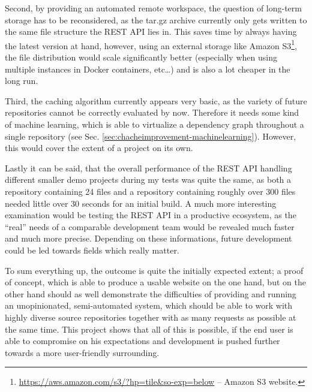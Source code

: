 Second, by providing an automated remote workspace, the question of long-term storage has to be reconsidered, as the tar.gz archive currently only gets written to the same file structure the REST API lies in. This saves time by always having the latest version at hand, however, using an external storage like Amazon S3\footnote{\url{https://aws.amazon.com/s3/?hp=tile&so-exp=below} -- Amazon S3 website.}, the file distribution would scale significantly better (especially when using multiple instances in Docker containers, etc\ldots) and is also a lot cheaper in the long run.

Third, the caching algorithm currently appears very basic, as the variety of future repositories cannot be correctly evaluated by now. Therefore it needs some kind of machine learning, which is able to virtualize a dependency graph throughout a single repository (see Sec. \ref{sec:chacheimprovement-machinelearning}). However, this would cover the extent of a project on its own.

Lastly it can be said, that the overall performance of the REST API handling different smaller demo projects during my tests was quite the same, as both a repository containing 24 files and a repository containing roughly over 300 files needed little over 30 seconds for an initial build. A much more interesting examination would be testing the REST API in a productive ecosystem, as the ``real'' needs of a comparable development team would be revealed much faster and much more precise. Depending on these informations, future development could be led towards fields which really matter.

To sum everything up, the outcome is quite the initially expected extent; a proof of concept, which is able to produce a usable website on the one hand, but on the other hand should as well demonstrate the difficulties of providing and running an unopinionated, semi-automated system, which should be able to work with highly diverse source repositories together with as many requests as possible at the same time. This project shows that all of this is possible, if the end user is able to compromise on his expectations and development is pushed further towards a more user-friendly surrounding.
